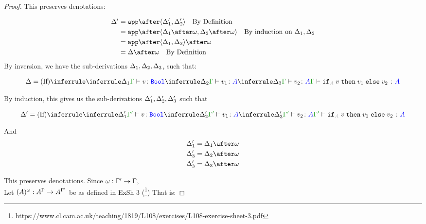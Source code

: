 \documentclass{report}
\begin{document}
\begin{framed}
\begin{proof}
            This preserves denotations:
        
            \begin{align*}
                \D' &= \app\after\pr{\D_1'}{\D_2'} \qt{By Definition}\\
                &= \app\after\pr{\D_1\after\w}{\D_2\after\w} \qt{By induction on $\D_1, \D_2$}\\
                &= \app\after\pr{\D_1}{\D_2}\after\w\\
                &= \D\after\w\qt{By Definition}
            \end{align*}
        By inversion, we have the sub-derivations $\Delta_1,\Delta_2,\Delta_3$, such that:
        
        
        \begin{equation}
            \D = \ntreeruleIII{If}{
                \treeruleI{\D_1}{\typerelation{\G}{v}{\B}}
                }{
                \treeruleI{\D_2}{\typerelation{\G}{v_1}{ A}}
                }{
                \treeruleI{\D_3}{\typerelation{\G}{v_2}{ A}}
            }{
                \typerelation{\G}{\pifthenelse{A}{v}{v_1}{v_2}}{ A}
            }
        \end{equation}
        
        By induction, this gives us the sub-derivations $\Delta_1', \Delta_2', \Delta_3'$ such that
        
        \begin{equation}
            \D' = \ntreeruleIII{If}{
                \treeruleI{\D_1'}{\typerelation{\G'}{v}{\B}}
                }{
                \treeruleI{\D_2'}{\typerelation{\G'}{v_1}{ A}}
                }{
                \treeruleI{\D_3'}{\typerelation{\G'}{v_2}{ A}}
            }{
                \typerelation{\G'}{\pifthenelse{A}{v}{v_1}{v_2}}{ A}
            }
        \end{equation}
        
        And 
        \begin{align*}
            \D_1' & =\D_1 \after \w\\
            \D_3' & =\D_2 \after \w\\
            \D_3' & =\D_3 \after \w 
        \end{align*}
        
        
        This preserves denotations.
        Since $\omega: \Gamma' \rightarrow \Gamma$, \\
        Let $(A)^{\omega}: A^{\Gamma}\rightarrow A^{\Gamma'}$ be as defined in ExSh 3 (\footnote{https://www.cl.cam.ac.uk/teaching/1819/L108/exercises/L108-exercise-sheet-3.pdf})
        That is:
        

\end{proof}
\end{framed}
\end{document}
